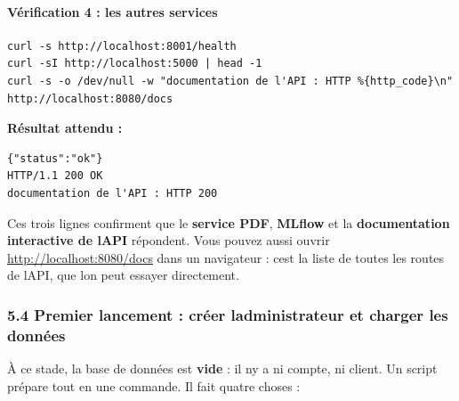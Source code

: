 \documentclass[
  french,
  11pt,
  a4paper,
]{article}
\begin{document}
\paragraph{Vérification 4 : les autres
services}\label{vuxe9rification-4--les-autres-services}

\begin{Verbatim}[breaklines=true,breakanywhere=true,fontsize=\small,frame=leftline,framerule=1.6pt,rulecolor=\color{credixblue},framesep=3mm,xleftmargin=2mm,xrightmargin=1mm]
curl -s http://localhost:8001/health
curl -sI http://localhost:5000 | head -1
curl -s -o /dev/null -w "documentation de l'API : HTTP %{http_code}\n" http://localhost:8080/docs
\end{Verbatim}

\textbf{Résultat attendu :}

\begin{Verbatim}[breaklines=true,breakanywhere=true,fontsize=\small,frame=leftline,framerule=1.6pt,rulecolor=\color{credixblue},framesep=3mm,xleftmargin=2mm,xrightmargin=1mm]
{"status":"ok"}
HTTP/1.1 200 OK
documentation de l'API : HTTP 200
\end{Verbatim}

Ces trois lignes confirment que le \textbf{service PDF}, \textbf{MLflow}
et la \textbf{documentation interactive de l\textquotesingle API}
répondent. Vous pouvez aussi ouvrir \url{http://localhost:8080/docs}
dans un navigateur : c\textquotesingle est la liste de toutes les routes
de l\textquotesingle API, que l\textquotesingle on peut essayer
directement.

\subsubsection{5.4 Premier lancement : créer
l\textquotesingle administrateur et charger les
données}\label{54-premier-lancement--cruxe9er-ladministrateur-et-charger-les-donnuxe9es}

À ce stade, la base de données est \textbf{vide} : il
n\textquotesingle y a ni compte, ni client. Un script prépare tout en
une commande. Il fait quatre choses :
\end{document}
